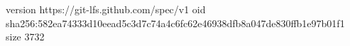 version https://git-lfs.github.com/spec/v1
oid sha256:582ea74333d10eead5c3d7c74a4c6fc62e46938dfb8a047de830ffb1e97b01f1
size 3732
